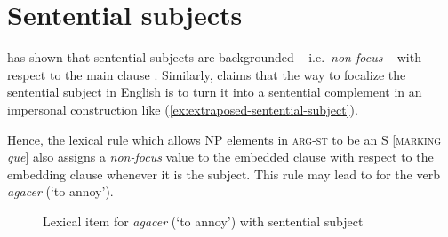 


\section{Sentential subjects}

\citet{Erteschik-Shir.1973} has shown that sentential subjects are backgrounded -- i.e.\ \emph{non-focus} -- with respect to the main clause \citep[see also later][]{Goldberg.2006}. Similarly, \citet{Lee.2018} claims that the way to focalize the sentential subject in English is to turn it into a sentential complement in an impersonal construction like (\ref{ex:extraposed-sentential-subject}).

Hence, the lexical rule which allows NP elements in \textsc{arg-st} to be an S [\textsc{marking} \textit{que}] also assigns a \emph{non-focus} value to the embedded clause with respect to the embedding clause whenever it is the subject. This rule may lead to  for the verb \emph{agacer} (`to annoy').

\begin{figure}[h]

\caption{Lexical item for \emph{agacer} (`to annoy') with  sentential subject}
\label{ex:avm-agacer}
\end{figure}

